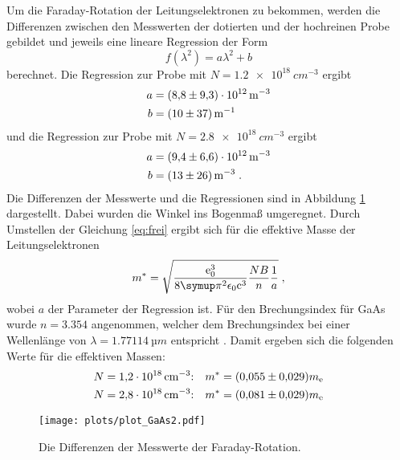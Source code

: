 Um die Faraday-Rotation der Leitungselektronen zu bekommen, werden die Differenzen zwischen den Messwerten der dotierten und der hochreinen
Probe gebildet und jeweils eine lineare Regression der Form
\begin{equation}
  f(\lambda^2) = a\lambda^2 + b
\end{equation}
berechnet.
Die Regression zur Probe mit $N = \SI{1.2e18}{cm^{-3}}$ ergibt
\begin{align*}
  a &= \SI{8.8\pm9.3e12}{m^{-3}} \\
  b &= \SI{10\pm37}{m^{-1}}
\end{align*}
und die Regression zur Probe mit $N = \SI{2.8e18}{cm^{-3}}$ ergibt
\begin{align*}
  a &= \SI{9.4\pm6.6e12}{m^{-3}} \\
  b &= \SI{13\pm26}{m^{-3}} \;.
\end{align*}
Die Differenzen der Messwerte und die Regressionen sind in Abbildung \ref{fig:GaAs2} dargestellt. Dabei wurden die Winkel ins Bogenmaß umgeregnet.
Durch Umstellen der Gleichung \eqref{eq:frei} ergibt sich für die effektive Masse der Leitungselektronen
\begin{equation}
  m^* = \sqrt{\frac{\text{e}_0^3}{8\pii^2\epsilon_0\text{c}^3}\frac{NB}{n}\frac{1}{a}} \;,
\end{equation}
wobei $a$ der Parameter der Regression ist. Für den Brechungsindex für GaAs wurde $n = \num{3.354}$ angenommen, welcher dem Brechungsindex bei einer
Wellenlänge von $\lambda = \SI{1.77114}{µm}$ entspricht \cite{n_GaAs}.
Damit ergeben sich die folgenden Werte für die effektiven Massen:
\begin{align*}
  N = \SI{1.2e18}{cm^{-3}} &\text{:}\quad m^*= (\num{0.055\pm0.029})m_\text{e} \\
  N = \SI{2.8e18}{cm^{-3}} &\text{:}\quad m^*= (\num{0.081\pm0.029})m_\text{e}
\end{align*}


\begin{figure}
  \centering
  \texttt{[image: plots/plot\_GaAs2.pdf]}
  \caption{Die Differenzen der Messwerte der Faraday-Rotation.}
  \label{fig:GaAs2}
\end{figure}
\newpage

